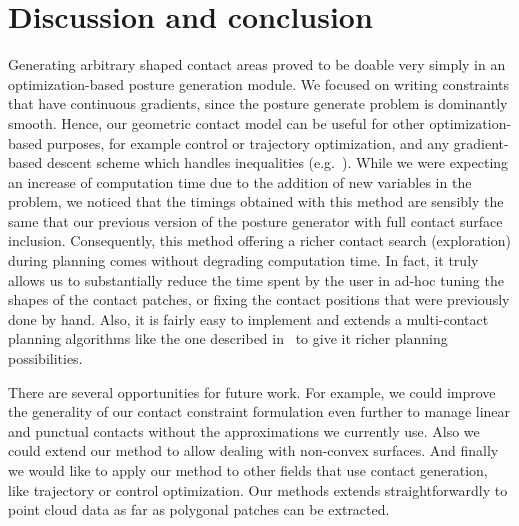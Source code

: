 \section{Discussion and conclusion}
Generating arbitrary shaped contact areas proved to be doable very simply in an optimization-based posture generation module. We focused on writing constraints that have continuous gradients, since the posture generate problem is dominantly smooth. Hence, our geometric contact model can be useful for other optimization-based purposes, for example control or trajectory optimization, and any gradient-based descent scheme which handles inequalities (e.g.~\cite{escande:icra:2010}).
While we were expecting an increase of computation time due to the addition of new variables in the problem,
we noticed that the timings obtained with this method are sensibly the same that our previous version of the posture generator with full contact surface inclusion. Consequently, this method offering a richer contact search (exploration) during planning comes without degrading computation time. In fact, it truly allows us to substantially reduce the time spent by the user in ad-hoc tuning the shapes of the contact patches, or fixing the contact positions that were previously done by hand. Also, it is fairly easy to implement and extends a multi-contact planning algorithms like the one described in~\cite{escande:ras:2013}{} to give it richer planning possibilities.

There are several opportunities for future work. For example, we could improve the generality of our contact constraint formulation even further to manage linear and punctual contacts without the approximations we currently use. Also we could extend our method to allow dealing with non-convex surfaces. And finally we would like to apply our method to other fields that use contact generation, like trajectory or control optimization. Our methods extends straightforwardly to point cloud data as far as polygonal patches can be extracted.

